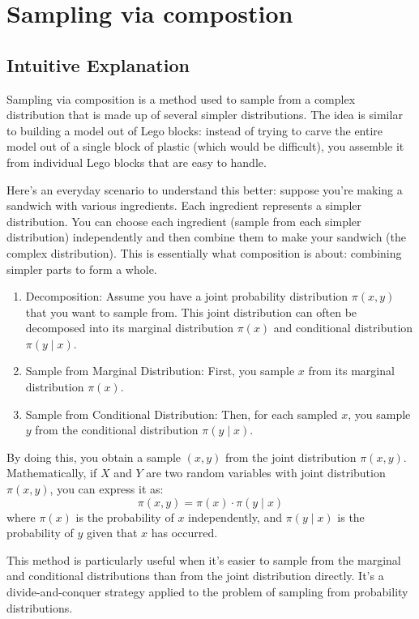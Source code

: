 \documentclass{article}
\begin{document}
\section{Sampling via compostion}
\subsection{Intuitive Explanation}
Sampling via composition is a method used to sample from a complex distribution that is made up of several simpler distributions. The idea is similar to building a model out of Lego blocks: instead of trying to carve the entire model out of a single block of plastic (which would be difficult), you assemble it from individual Lego blocks that are easy to handle.

Here's an everyday scenario to understand this better: suppose you're making a sandwich with various ingredients. Each ingredient represents a simpler distribution. You can choose each ingredient (sample from each simpler distribution) independently and then combine them to make your sandwich (the complex distribution). This is essentially what composition is about: combining simpler parts to form a whole.
\begin{enumerate}
    \item Decomposition: Assume you have a joint probability distribution $\pi(x, y)$ that you want to sample from. This joint distribution can often be decomposed into its marginal distribution $\pi(x)$ and conditional distribution $\pi(y \mid x)$.
    \item Sample from Marginal Distribution: First, you sample $x$ from its marginal distribution $\pi(x)$.
    \item Sample from Conditional Distribution: Then, for each sampled $x$, you sample $y$ from the conditional distribution $\pi(y \mid x)$.
\end{enumerate}

By doing this, you obtain a sample $(x, y)$ from the joint distribution $\pi(x, y)$. Mathematically, if $X$ and $Y$ are two random variables with joint distribution $\pi(x, y)$, you can express it as:
$$
\pi(x, y)=\pi(x) \cdot \pi(y \mid x)
$$
where $\pi(x)$ is the probability of $x$ independently, and $\pi(y \mid x)$ is the probability of $y$ given that $x$ has occurred.

This method is particularly useful when it's easier to sample from the marginal and conditional distributions than from the joint distribution directly. It's a divide-and-conquer strategy applied to the problem of sampling from probability distributions.
\end{document}
